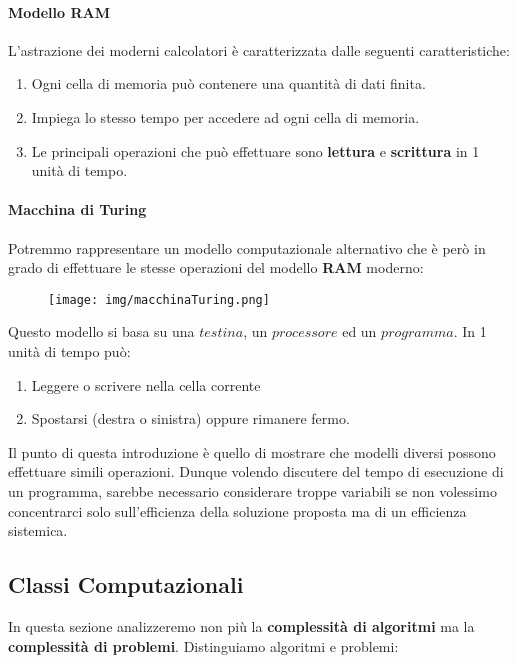\documentclass{article}
\begin{document}
\paragraph{Modello RAM} L'astrazione dei moderni calcolatori è caratterizzata dalle seguenti caratteristiche:

\begin{enumerate}
    \item Ogni cella di memoria può contenere una quantità di dati finita.
    \item Impiega lo stesso tempo per accedere ad ogni cella di memoria.
    \item Le principali operazioni che può effettuare sono \textbf{lettura} e \textbf{scrittura} in 1 unità di tempo.
\end{enumerate}

\paragraph{Macchina di Turing} Potremmo rappresentare un modello computazionale alternativo che è però in grado di effettuare le stesse operazioni del modello \textbf{RAM} moderno:

\begin{figure}[htbp]
    \center
    \texttt{[image: img/macchinaTuring.png]}
\end{figure}

Questo modello si basa su una $testina$, un $processore$ ed un $programma$. In 1 unità di tempo può:
\begin{enumerate}
    \item Leggere o scrivere nella cella corrente
    \item Spostarsi (destra o sinistra) oppure rimanere fermo.
\end{enumerate}

Il punto di questa introduzione è quello di mostrare che modelli diversi possono effettuare simili operazioni. Dunque volendo discutere del tempo di esecuzione di un programma, sarebbe necessario considerare troppe variabili se non volessimo concentrarci solo sull'efficienza della soluzione proposta ma di un efficienza sistemica.

\subsection{Classi Computazionali}

In questa sezione analizzeremo non più la \textbf{complessità di algoritmi} ma la \textbf{complessità di problemi}. Distinguiamo algoritmi e problemi:
\end{document}
